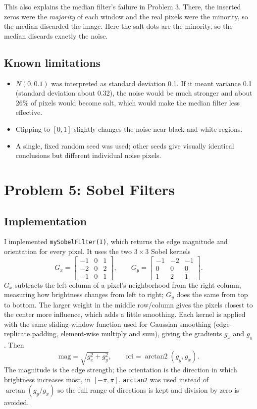 \documentclass[11pt]{article}
\begin{document}
This also explains the median filter's failure in Problem 3. There, the
inserted zeros were the \emph{majority} of each window and the real pixels were
the minority, so the median discarded the image. Here the salt dots are the
minority, so the median discards exactly the noise.

\subsection*{Known limitations}
\begin{itemize}
  \item $N(0, 0.1)$ was interpreted as standard deviation 0.1. If it meant
        variance 0.1 (standard deviation about 0.32), the noise would be much
        stronger and about 26\% of pixels would become salt, which would make
        the median filter less effective.
  \item Clipping to $[0, 1]$ slightly changes the noise near black and white
        regions.
  \item A single, fixed random seed was used; other seeds give visually
        identical conclusions but different individual noise pixels.
\end{itemize}


\section*{Problem 5: Sobel Filters}

\subsection*{Implementation}
I implemented \texttt{mySobelFilter(I)}, which returns the edge magnitude and
orientation for every pixel. It uses the two $3 \times 3$ Sobel kernels
\[
G_x = \begin{bmatrix} -1 & 0 & 1\\ -2 & 0 & 2\\ -1 & 0 & 1 \end{bmatrix},
\qquad
G_y = \begin{bmatrix} -1 & -2 & -1\\ 0 & 0 & 0\\ 1 & 2 & 1 \end{bmatrix}.
\]
$G_x$ subtracts the left column of a pixel's neighborhood from the right column,
measuring how brightness changes from left to right; $G_y$ does the same from
top to bottom. The larger weight in the middle row/column gives the pixels
closest to the center more influence, which adds a little smoothing. Each kernel
is applied with the same sliding-window function used for Gaussian smoothing
(edge-replicate padding, element-wise multiply and sum), giving the gradients
$g_x$ and $g_y$. Then
\[
\text{mag} = \sqrt{g_x^2 + g_y^2}, \qquad \text{ori} = \operatorname{arctan2}(g_y, g_x).
\]
The magnitude is the edge strength; the orientation is the direction in which
brightness increases most, in $[-\pi, \pi]$. \texttt{arctan2} was used instead of
$\arctan(g_y/g_x)$ so the full range of directions is kept and division by zero
is avoided.
\end{document}
